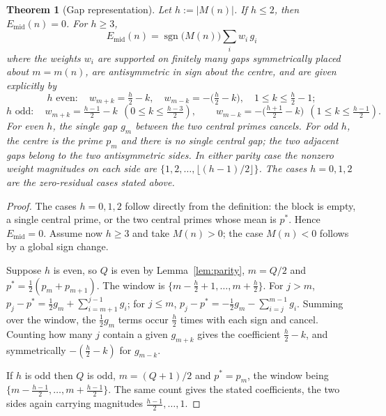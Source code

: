 \documentclass[11pt]{amsart}
\numberwithin{equation}{section}
\theoremstyle{plain}
\newtheorem{theorem}{Theorem}[section]
\theoremstyle{definition}
\theoremstyle{remark}
\newcommand{\Mert}{M}
\newcommand{\Sq}{Q}
\begin{document}
\begin{theorem}[Gap representation]\label{thm:gaps}
Let $h:=|\Mert(n)|$. If $h\le2$, then $E_{\mathrm{mid}}(n)=0$. For $h\ge3$,
\begin{equation}
\label{eq:gap-representation}
\boxed{\;
E_{\mathrm{mid}}(n)=\operatorname{sgn}\bigl(\Mert(n)\bigr)\sum_{i}w_i\,g_i \;}
\end{equation}
where the weights $w_i$ are supported on finitely many gaps symmetrically
placed about $m=m(n)$, are antisymmetric in sign about the centre, and are given
explicitly by
\begin{equation}
\label{eq:even-weights}
h \text{ even}:\quad
w_{m+k}=\tfrac h2-k,\quad w_{m-k}=-\bigl(\tfrac h2-k\bigr),\quad 1\le k\le \tfrac h2-1;
\end{equation}
\begin{equation}
\label{eq:odd-weights}
h \text{ odd}:\quad
w_{m+k}=\tfrac{h-1}2-k \ \ (0\le k\le \tfrac{h-3}2),
\qquad
w_{m-k}=-\bigl(\tfrac{h+1}2-k\bigr)\ \ (1\le k\le \tfrac{h-1}2).
\end{equation}
For even $h$, the single gap $g_m$ between the two central primes cancels. For odd
$h$, the centre is the prime $p_m$ and there is no single central gap; the two adjacent
gaps belong to the two antisymmetric sides. In either parity case the nonzero weight
magnitudes on each side are $\{1,2,\dots,\lfloor (h-1)/2\rfloor\}$. The cases
$h=0,1,2$ are the zero-residual cases stated above.
\end{theorem}

\begin{proof}
The cases $h=0,1,2$ follow directly from the definition: the block is empty, a
single central prime, or the two central primes whose mean is $p^*$. Hence
$E_{\mathrm{mid}}=0$. Assume now $h\ge3$ and take $\Mert(n)>0$; the case
$\Mert(n)<0$ follows by a global sign change.

Suppose $h$ is even, so $\Sq$ is even by Lemma~\ref{lem:parity}, $m=\Sq/2$ and
$p^{*}=\tfrac12(p_m+p_{m+1})$. The window is $\{m-\tfrac h2+1,\dots,m+\tfrac h2\}$.
For $j>m$, $p_j-p^{*}=\tfrac12 g_m+\sum_{i=m+1}^{j-1}g_i$; for $j\le m$,
$p_j-p^{*}=-\tfrac12 g_m-\sum_{i=j}^{m-1}g_i$. Summing over the window, the
$\tfrac12 g_m$ terms occur $\tfrac h2$ times with each sign and cancel. Counting
how many $j$ contain a given $g_{m+k}$ gives the coefficient $\tfrac h2-k$, and
symmetrically $-(\tfrac h2-k)$ for $g_{m-k}$.

If $h$ is odd then $\Sq$ is odd, $m=(\Sq+1)/2$ and $p^{*}=p_m$, the window being
$\{m-\tfrac{h-1}2,\dots,m+\tfrac{h-1}2\}$. The same count gives the stated
coefficients, the two sides again carrying magnitudes
$\tfrac{h-1}2,\dots,1$.
\end{proof}
\end{document}
